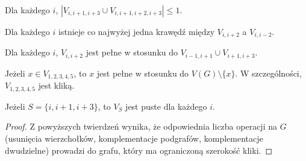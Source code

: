 \documentclass[polish]{beamer}
\begin{document}
\begin{frame}
    \begin{theorem}
        \renewcommand{\qedsymbol}{}
        Dla każdego $i$, $|V_{i,i+1,i+3} \cup V_{i,i+1,i+2,i+3}| \leq 1$.
    \end{theorem}
    \graphBigger
\end{frame}

\begin{frame}
    \begin{theorem}
        \renewcommand{\qedsymbol}{}
        Dla każdego $i$ istnieje co najwyżej jedna krawędź między $V_{i,i+2}$ a $V_{i,i-2}$.
    \end{theorem}
    \graphBigger
\end{frame}

\begin{frame}
    \begin{theorem}
        \renewcommand{\qedsymbol}{}
        Dla każdego $i$, $V_{i,i+2}$ jest pełne w stosunku do $V_{i-1,i+1} \cup V_{i+1,i+3}$.
    \end{theorem}
    \graphBigger
\end{frame}

\begin{frame}
    \begin{theorem}
        \renewcommand{\qedsymbol}{}
        Jeżeli $x \in V_{1,2,3,4,5}$, to $x$ jest pełne w stosunku do $V(G) \setminus \{x\}$. W szczególności, $V_{1,2,3,4,5}$ jest kliką.
    \end{theorem}
    \graphBigger
\end{frame}

\begin{frame}
    \begin{theorem}
        \renewcommand{\qedsymbol}{}
        Jeżeli $S = \{i, i+1, i+3\}$, to $V_S$ jest puste dla każdego $i$.
    \end{theorem}
    \graphBigger
\end{frame}

\begin{frame}
    \begin{proof}      
        Z powyższych twierdzeń wynika, że odpowiednia liczba operacji na $G$ (usunięcia wierzchołków, komplementacje podgrafów, komplementacje dwudzielne) prowadzi do grafu, który ma ograniczoną szerokość kliki.
        \end{proof}
\end{frame}
\end{document}
